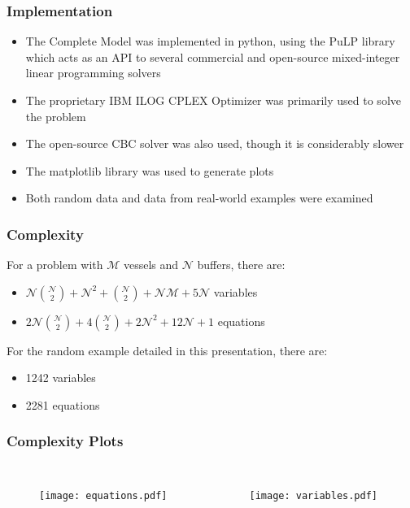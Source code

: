 \documentclass{beamer}
\begin{document}
\begin{frame}
    \frametitle{Implementation}
    \begin{itemize}
        \item The Complete Model was implemented in python, using the PuLP
            library which acts as an API to several commercial and open-source
            mixed-integer linear programming solvers
        \item The proprietary IBM ILOG CPLEX Optimizer was primarily used to
            solve the problem
        \item The open-source CBC solver was also used, though it is
            considerably slower
        \item The matplotlib library was used to generate plots
        \item Both random data and data from real-world examples were examined
    \end{itemize}
\end{frame}

\begin{frame}
    \frametitle{Complexity}
    For a problem with $\mathcal{M}$ vessels and $\mathcal{N}$ buffers, there
    are:
    \begin{itemize}
        \item $\mathcal{N} {{\mathcal{N}}\choose{2}} + \mathcal{N}^2 
         + {{\mathcal{N}}\choose{2}} + \mathcal{N} \mathcal{M} + 5\mathcal{N}$
        variables
        \item $2\mathcal{N}{{\mathcal{N}}\choose{2}} 
        + 4{{\mathcal{N}}\choose{2}} + 2\mathcal{N}^2 + 12\mathcal{N} + 1$
        equations
    \end{itemize}
    \vspace{0.5cm}
    For the random example detailed in this presentation, there are:
    \begin{itemize}
        \item 1242 variables
        \item 2281 equations
    \end{itemize}
\end{frame}

\begin{frame}
    \frametitle{Complexity Plots}
    \begin{columns}
        \begin{figure}
            \centering
            \texttt{[image: equations.pdf]}
        \end{figure}
        \begin{figure}
            \centering
            \texttt{[image: variables.pdf]}
        \end{figure}
    \end{columns}
\end{frame}
\end{document}
